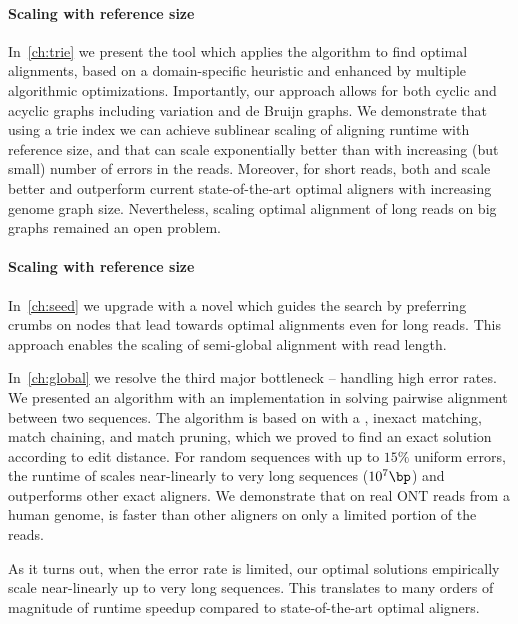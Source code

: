 \paragraph{Scaling with reference size}
In~\cref{ch:trie} we present the tool \astarix which applies the \A algorithm to
find optimal alignments, based on a domain-specific heuristic and enhanced by
multiple algorithmic optimizations. Importantly, our approach allows for both
cyclic and acyclic graphs including variation and de Bruijn graphs. We
demonstrate that using a trie index we can achieve sublinear scaling of aligning
runtime with reference size, and that \A can scale exponentially better than
\dijkstra with increasing (but small) number of errors in the reads. Moreover,
for short reads, both \astarix and \dijkstra scale better and outperform current
state-of-the-art optimal aligners with increasing genome graph size.
Nevertheless, scaling optimal alignment of long reads on big graphs remained an
open problem.

\paragraph{Scaling with reference size}
In~\cref{ch:seed} we upgrade \astarix with a novel \sh which guides the \A
search by preferring crumbs on nodes that lead towards optimal alignments even
for long reads. This approach enables the scaling of semi-global alignment with
read length.

In~\cref{ch:global} we resolve the third major bottleneck -- handling high error
rates. We presented an algorithm with an implementation in \astarpa solving
pairwise alignment between two sequences. The algorithm is based on \A with a
\sh, inexact matching, match chaining, and match pruning, which we proved to
find an exact solution according to edit distance. For random sequences with up
to $15\%$ uniform errors, the runtime of \astarpa scales near-linearly to very
long sequences ($10^7\bp$) and outperforms other exact aligners. We demonstrate
that on real ONT reads from a human genome, \astarpa is faster than other
aligners on only a limited portion of the reads.

As it turns out, when the error rate is limited, our optimal solutions
empirically scale near-linearly up to very long sequences. This translates to
many orders of magnitude of runtime speedup compared to state-of-the-art optimal
aligners.
